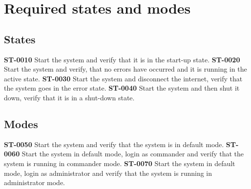 \section{Required states and modes}
\subsection{States}
\textbf{ST-0010} Start the system and verify that it is in the start-up state.
\textbf{ST-0020} Start the system and verify, that no errors have occurred and it is running in the active state.
\textbf{ST-0030} Start the system and disconnect the internet, verify that the system goes in the error state. 
\textbf{ST-0040} Start the system and then shut it down, verify that it is in a shut-down state.
\subsection{Modes}
\textbf{ST-0050} Start the system and verify that the system is in default mode.
\textbf{ST-0060} Start the system in default mode, login as commander and verify that the system is running in commander mode.
\textbf{ST-0070} Start the system in default mode, login as administrator and verify that the system is running in administrator mode.